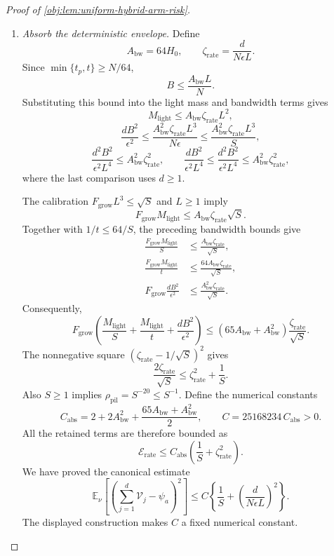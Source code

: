 \begin{proof}[Proof of \cref{obj:lem:uniform-hybrid-arm-risk}]
\begin{enumerate}
\item \textit{Absorb the deterministic envelope.}
Define
\[
A_{\mathrm{bw}}=64H_0,
\qquad
\zeta_{\mathrm{rate}}=\frac{d}{N\epsilon L}.
\]
Since \(\min\{t_p,t\}\ge N/64\),
\[
B\le\frac{A_{\mathrm{bw}}L}{N}.
\]
Substituting this bound into the light mass and bandwidth terms gives
\[
M_{\mathrm{light}}
\le A_{\mathrm{bw}}\zeta_{\mathrm{rate}}L^2,
\]
\[
\frac{dB^2}{\epsilon^2}
\le
\frac{A_{\mathrm{bw}}^2\zeta_{\mathrm{rate}}L^3}{N\epsilon}
\le
\frac{A_{\mathrm{bw}}^2\zeta_{\mathrm{rate}}L^3}{S},
\]
\[
\frac{d^2B^2}{\epsilon^2L^4}
\le A_{\mathrm{bw}}^2\zeta_{\mathrm{rate}}^2,
\qquad
\frac{dB^2}{\epsilon^2L^4}
\le\frac{d^2B^2}{\epsilon^2L^4}
\le A_{\mathrm{bw}}^2\zeta_{\mathrm{rate}}^2,
\]
where the last comparison uses \(d\ge1\).

The calibration \(F_{\mathrm{grow}}L^3\le\sqrt S\) and \(L\ge1\) imply
\[
F_{\mathrm{grow}}M_{\mathrm{light}}
\le A_{\mathrm{bw}}\zeta_{\mathrm{rate}}\sqrt S.
\]
Together with \(1/t\le64/S\), the preceding bandwidth bounds give
\[
\begin{aligned}
\frac{F_{\mathrm{grow}}M_{\mathrm{light}}}{S}
&\le\frac{A_{\mathrm{bw}}\zeta_{\mathrm{rate}}}{\sqrt S},\\
\frac{F_{\mathrm{grow}}M_{\mathrm{light}}}{t}
&\le\frac{64A_{\mathrm{bw}}\zeta_{\mathrm{rate}}}{\sqrt S},\\
F_{\mathrm{grow}}\frac{dB^2}{\epsilon^2}
&\le\frac{A_{\mathrm{bw}}^2\zeta_{\mathrm{rate}}}{\sqrt S}.
\end{aligned}
\]
Consequently,
\[
F_{\mathrm{grow}}
\left(
\frac{M_{\mathrm{light}}}{S}
+\frac{M_{\mathrm{light}}}{t}
+\frac{dB^2}{\epsilon^2}
\right)
\le
(65A_{\mathrm{bw}}+A_{\mathrm{bw}}^2)
\frac{\zeta_{\mathrm{rate}}}{\sqrt S}.
\]
The nonnegative square
\((\zeta_{\mathrm{rate}}-1/\sqrt S)^2\) gives
\[
\frac{2\zeta_{\mathrm{rate}}}{\sqrt S}
\le\zeta_{\mathrm{rate}}^2+\frac1S.
\]
Also \(S\ge1\) implies \(\rho_{\mathrm{pil}}=S^{-20}\le S^{-1}\).
Define the numerical constants
\[
C_{\mathrm{abs}}
=
2+2A_{\mathrm{bw}}^2
+\frac{65A_{\mathrm{bw}}+A_{\mathrm{bw}}^2}{2},
\qquad
C=25168234\,C_{\mathrm{abs}}>0.
\]
All the retained terms are therefore bounded as
\[
\mathscr E_{\mathrm{rate}}
\le
C_{\mathrm{abs}}
\left(\frac1S+\zeta_{\mathrm{rate}}^2\right).
\]
We have proved the canonical estimate
\[
\mathbb E_\nu\left[
\left(\sum_{j=1}^d\mathcal V_j-\psi_a\right)^2
\right]
\le
C\left\{
\frac1S+\left(\frac{d}{N\epsilon L}\right)^2
\right\}.
\]
The displayed construction makes \(C\) a fixed numerical constant.


\end{enumerate}
\end{proof}
